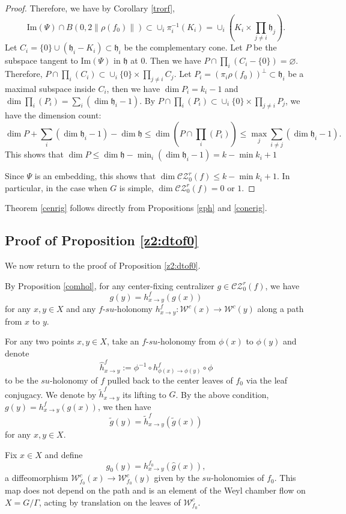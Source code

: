 \documentclass[11pt]{amsart}
\numberwithin{equation}{section}
\newcommand{\W}{\mathcal{W}}
\newcommand{\CZ}{\mathcal{CZ}}
\theoremstyle{plain}
\begin{document}
\begin{proof}
Therefore, we have by Corollary \ref{trorf},
\[
\mathrm{Im}(\Psi) \cap B(0,2\|\rho(f_0)\|) \subset \cup_i \pi_i^{-1}(K_i)=\cup_i (K_i\times\prod_{j\neq i}\mathfrak h_j)
.\]
 Let $C_i=\{0\}\cup(\mathfrak h_i-K_i)\subset \mathfrak h_i$ be the complementary cone. Let $P$ be the subspace tangent to $\mathrm{Im}(\Psi)$ in $\mathfrak h$ at $0$. Then we have $P\cap \prod_i(C_i-\{0\})=\varnothing$. Therefore, $P\cap \prod_i(C_i)\subset \cup_{i}\{0\}\times \prod_{j\neq i} C_j$. Let $P_i=(\pi_i\rho(f_0))^\perp\subset \mathfrak h_i$ be a maximal subspace inside $C_i$, then we have $\dim P_i=k_i-1$ and $\dim \prod_i(P_i)=\sum_i(\dim \mathfrak h_i-1)$. By $P\cap \prod_i(P_i)\subset \cup_{i}\{0\}\times \prod_{j\neq i} P_j$, we have the dimension count: 
$$\dim P+\sum_i(\dim \mathfrak h_i-1)-\dim \mathfrak h\le\dim (P\cap \prod_i(P_i))\le \max_j \sum_{i\neq j}(\dim \mathfrak h_i-1).$$ This shows that $\dim P\le \dim \mathfrak h-\min_i(\dim \mathfrak h_i-1)=k-\min k_i+1$

Since $\Psi$ is an embedding, this shows that $\dim \CZ^r_0(f) \le k - \min k_i + 1$. In particular, in the case when $G$ is simple, $\dim \CZ^r_0(f)=0$ or $1$.
\end{proof}

\color{black}
Theorem \ref{cenrig} follows directly from Propositions \ref{gph} and \ref{conerig}.



\subsection{Proof of Proposition \ref{z2:dtof0}}

We now return to the proof of Proposition \ref{z2:dtof0}.

By Proposition \ref{comhol}, for any center-fixing centralizer $g\in \CZ^r_0(f)$, we have
$$
g(y) = h^f_{x\to y}(g(x))
$$
for any $x,y\in X$ and any $f$-$su$-holonomy $h^f_{x\to y}: \W^c(x)\to \W^c(y)$ along a path from $x$ to $y$.

For any two points $x,y\in X$, take an $f$-$su$-holonomy from $\phi(x)$ to $\phi(y)$ and denote
$$
\hat{h}^f_{x\to y} := \phi^{-1} \circ h^f_{\phi(x)\to \phi(y)} \circ \phi
$$
to be the $su$-holonomy of $f$ pulled back to the center leaves of $f_0$ via the leaf conjugacy. We denote by $\tilde h^f_{x\to y}$ its lifting to $G$. By the above condition, $g(y)=h^f_{x\to y}(g(x))$, we then have
$$
\tilde{g}(y) = \tilde{h}^f_{x\to y}(\tilde{g}(x))
$$
for any $x,y\in X$.

Fix $x\in X$ and define
$$
g_0(y) = h^{f_0}_{x\to y}(\hat{g}(x)),
$$
a diffeomorphism $\W^c_{f_0}(x)\to \W^c_{f_0}(y)$ given by the $su$-holonomies of $f_0$. This map does not depend on the path and is an element of the Weyl chamber flow on $X=G/\Gamma$, acting by translation on the leaves of $\W^c_{f_0}$.
\end{document}
